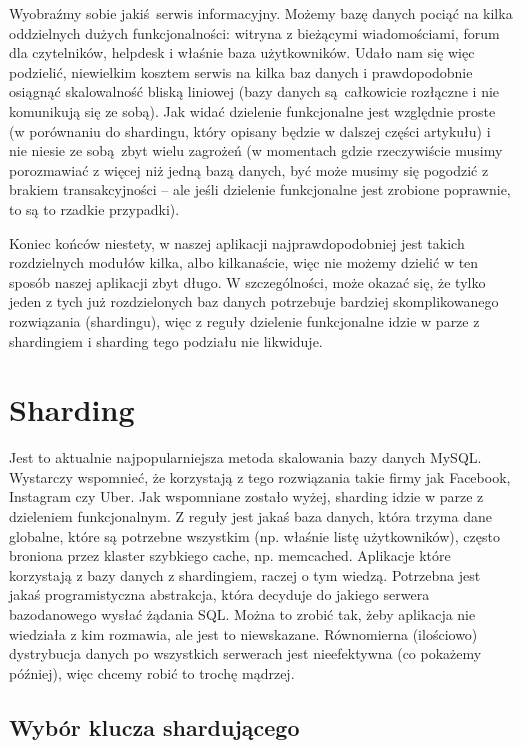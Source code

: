 \documentclass[a4paper,12pt]{article}
\begin{document}
Wyobraźmy sobie jakiś serwis informacyjny. Możemy bazę danych pociąć na kilka oddzielnych dużych funkcjonalności: witryna z bieżącymi wiadomościami, forum dla czytelników, helpdesk i właśnie baza użytkowników. Udało nam się więc podzielić, niewielkim kosztem serwis na kilka baz danych i prawdopodobnie osiągnąć  skalowalność bliską liniowej (bazy danych są całkowicie rozłączne i nie komunikują się ze sobą). Jak widać dzielenie funkcjonalne jest względnie proste (w porównaniu do shardingu, który opisany będzie w dalszej części artykułu) i nie niesie ze sobą zbyt wielu zagrożeń (w momentach gdzie rzeczywiście musimy porozmawiać z więcej niż jedną bazą danych, być może musimy się pogodzić z brakiem transakcyjności – ale jeśli dzielenie funkcjonalne jest zrobione poprawnie, to są to rzadkie przypadki).

Koniec końców niestety, w naszej aplikacji najprawdopodobniej jest takich rozdzielnych modułów kilka, albo kilkanaście, więc nie możemy dzielić w ten sposób naszej aplikacji zbyt długo. W szczególności, może okazać się, że tylko jeden z tych już rozdzielonych baz danych potrzebuje bardziej skomplikowanego rozwiązania (shardingu), więc z reguły dzielenie funkcjonalne idzie w parze z shardingiem i sharding tego podziału nie likwiduje.

\section{Sharding}

Jest to aktualnie najpopularniejsza metoda skalowania bazy danych MySQL. Wystarczy wspomnieć, że korzystają z tego rozwiązania takie firmy jak Facebook, Instagram czy Uber. Jak wspomniane zostało wyżej, sharding idzie w parze z dzieleniem funkcjonalnym. Z reguły jest jakaś baza danych, która trzyma dane globalne, które są potrzebne wszystkim (np. właśnie listę użytkowników), często broniona przez klaster szybkiego cache, np. memcached. Aplikacje które korzystają z bazy danych z shardingiem, raczej o tym wiedzą. Potrzebna jest jakaś programistyczna abstrakcja, która decyduje do jakiego serwera bazodanowego wysłać żądania SQL. Można to zrobić tak, żeby aplikacja nie wiedziała z kim rozmawia, ale jest to niewskazane. Równomierna (ilościowo) dystrybucja danych po wszystkich serwerach jest nieefektywna (co pokażemy później), więc chcemy robić to trochę mądrzej.

\subsection{Wybór klucza shardującego}
\end{document}
